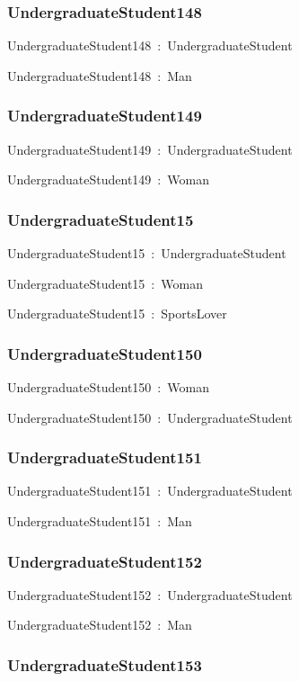 \documentclass{article}
\begin{document}
\subsubsection*{UndergraduateStudent148}

UndergraduateStudent148~:~UndergraduateStudent

UndergraduateStudent148~:~Man

\subsubsection*{UndergraduateStudent149}

UndergraduateStudent149~:~UndergraduateStudent

UndergraduateStudent149~:~Woman

\subsubsection*{UndergraduateStudent15}

UndergraduateStudent15~:~UndergraduateStudent

UndergraduateStudent15~:~Woman

UndergraduateStudent15~:~SportsLover

\subsubsection*{UndergraduateStudent150}

UndergraduateStudent150~:~Woman

UndergraduateStudent150~:~UndergraduateStudent

\subsubsection*{UndergraduateStudent151}

UndergraduateStudent151~:~UndergraduateStudent

UndergraduateStudent151~:~Man

\subsubsection*{UndergraduateStudent152}

UndergraduateStudent152~:~UndergraduateStudent

UndergraduateStudent152~:~Man

\subsubsection*{UndergraduateStudent153}
\end{document}
